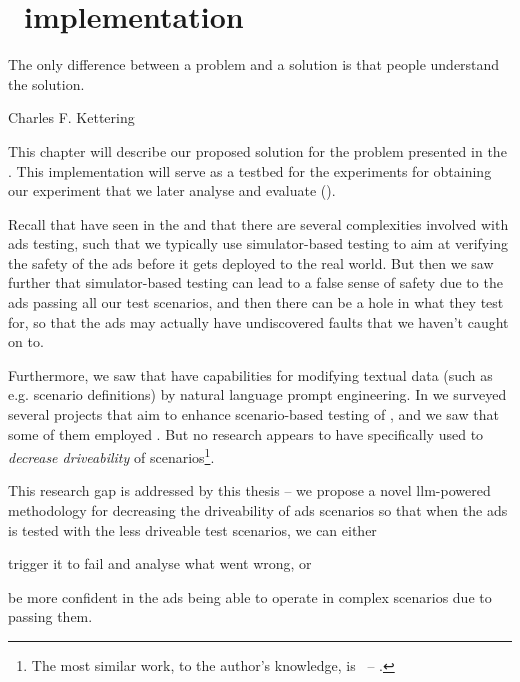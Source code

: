\chapter{\hefe~implementation}\label{chp:solutionProposal}

\epigraph{The only difference between a problem and a solution is that people understand the solution.}{Charles F. Kettering}

This chapter will describe our proposed solution for the problem presented in the
. This implementation will serve as a testbed for the
experiments for obtaining our experiment  that we later
analyse and evaluate ().

Recall that have seen in the  and 
that there are several complexities involved with \acrshort{ads} testing, such
that we typically use simulator-based testing to aim at verifying the safety of
the \acrshort{ads} before it gets deployed to the real world. But then we saw
further that simulator-based testing can lead to a false sense of safety due to
the \acrshort{ads} passing all our test scenarios, and then there can be a hole
in what they test for, so that the \acrshort{ads} may actually have
undiscovered faults that we haven't caught on to.

Furthermore, we saw that  have capabilities for modifying textual
data (such as e.g. scenario definitions) by natural language prompt engineering.
In  we surveyed several projects that aim to
enhance scenario-based testing of , and we saw that some of them
employed . But no research appears to have specifically used
 to \emph{decrease driveability} of 
scenarios\footnote{The most similar work, to the author's knowledge,
    is~\cite{yao2025agentsllm} -- .}.

This research gap is addressed by this thesis -- we propose a novel
\acrshort{llm}-powered methodology for decreasing the driveability of
\acrshort{ads} scenarios so that when the \acrshort{ads} is tested with the less
driveable test scenarios, we can either \begin{inparaenum}
    \item trigger it to fail and analyse what went wrong, or
    \item be more confident in the \acrshort{ads} being able to operate in
    complex scenarios due to passing them.
\end{inparaenum}

